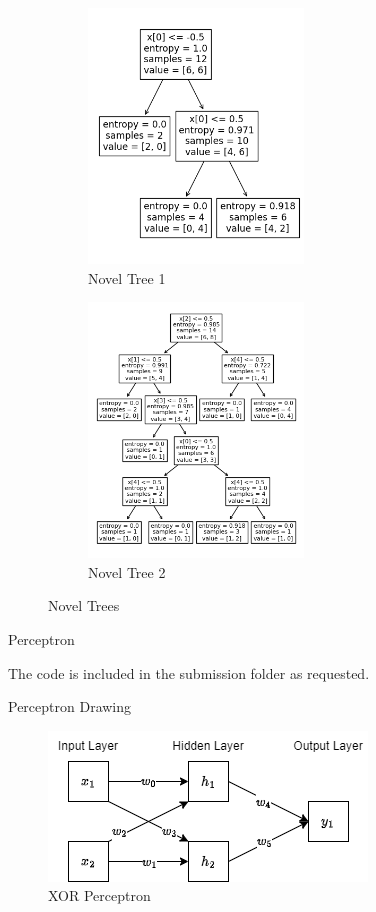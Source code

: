 \documentclass[12pt]{article}
\begin{document}
\begin{figure}[!ht]
    \centering
    \begin{subfigure}{0.5\textwidth}
        \centering
        \includegraphics[height=256px]{Images/Question 7 Tree 1.png}
        \caption{Novel Tree 1}
    \end{subfigure}%
    \begin{subfigure}{0.5\textwidth}
        \centering
        \includegraphics[height=256px]{Images/Question 7 Tree 2.png}
        \caption{Novel Tree 2}
    \end{subfigure}
    \caption{Novel Trees}
\end{figure}

\newpage
\problem Perceptron

\solution The code is included in the submission folder as requested.

\newpage
\problem Perceptron Drawing

\solution
\begin{figure}[!ht]
    \centering
    \includegraphics{Images/Question 9 Perceptron.png}
    \caption{XOR Perceptron}
\end{figure}
\end{document}
